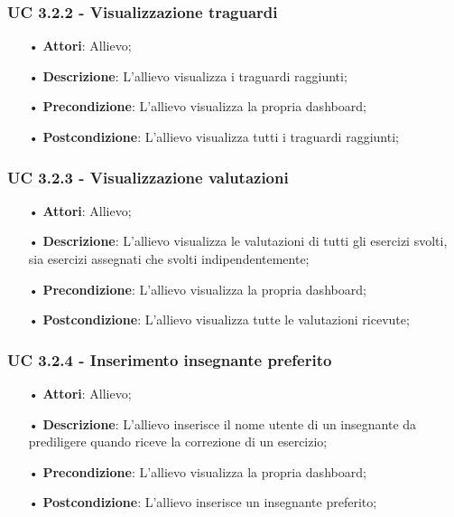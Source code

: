 \subsubsection{UC 3.2.2 - Visualizzazione traguardi}
\begin{itemize}
\item[•]\textbf{Attori}: Allievo;
\item[•]\textbf{Descrizione}: L'allievo visualizza i traguardi raggiunti;
\item[•]\textbf{Precondizione}: L'allievo visualizza la propria {dashboard};
\item[•]\textbf{Postcondizione}: L'allievo visualizza tutti i traguardi raggiunti;
\end{itemize}

\subsubsection{UC 3.2.3 - Visualizzazione valutazioni}
\begin{itemize}
\item[•]\textbf{Attori}: Allievo;
\item[•]\textbf{Descrizione}: L'allievo visualizza le valutazioni di tutti gli esercizi svolti, sia esercizi assegnati che svolti indipendentemente;
\item[•]\textbf{Precondizione}: L'allievo visualizza la propria {dashboard};
\item[•]\textbf{Postcondizione}: L'allievo visualizza tutte le valutazioni ricevute;
\end{itemize}

\subsubsection{UC 3.2.4 - Inserimento insegnante preferito}
\begin{itemize}
\item[•]\textbf{Attori}: Allievo;
\item[•]\textbf{Descrizione}: L'allievo inserisce il nome utente di un insegnante da prediligere quando riceve la correzione di un esercizio;
\item[•]\textbf{Precondizione}: L'allievo visualizza la propria {dashboard};
\item[•]\textbf{Postcondizione}: L'allievo inserisce un insegnante preferito;
\end{itemize}

